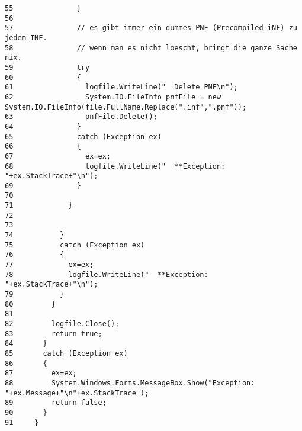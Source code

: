 \begin{verbatim}
55               }
56 
57               // es gibt immer ein dummes PNF (Precompiled iNF) zu jedem INF.
58               // wenn man es nicht loescht, bringt die ganze Sache nix.
59               try 
60               {
61                 logfile.WriteLine("  Delete PNF\n");
62                 System.IO.FileInfo pnfFile = new System.IO.FileInfo(file.FullName.Replace(".inf",".pnf"));
63                 pnfFile.Delete();
64               } 
65               catch (Exception ex)
66               {
67                 ex=ex;
68                 logfile.WriteLine("  **Exception: "+ex.StackTrace+"\n");
69               }
70 
71             }
72 
73 
74           } 
75           catch (Exception ex)
76           {
77             ex=ex;
78             logfile.WriteLine("  **Exception: "+ex.StackTrace+"\n");
79           }
80         }
81 
82         logfile.Close();
83         return true;
84       } 
85       catch (Exception ex)
86       {
87         ex=ex;
88         System.Windows.Forms.MessageBox.Show("Exception: "+ex.Message+"\n"+ex.StackTrace );
89         return false;
90       }
91     }
\end{verbatim}\normalsize 
